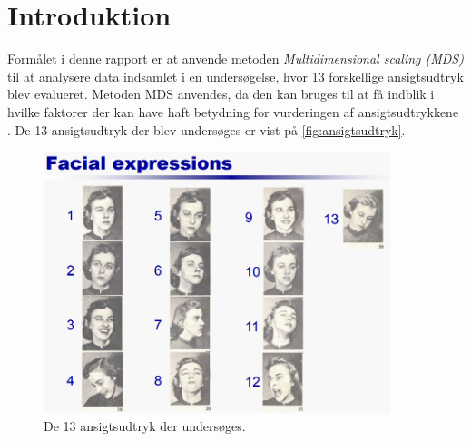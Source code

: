 \section*{Introduktion}
\label{Introduktion}
%
Formålet i denne rapport er at anvende metoden \textit{Multidimensional scaling (MDS)} til at analysere data indsamlet i en undersøgelse, hvor 13 forskellige ansigtsudtryk blev evalueret. Metoden MDS anvendes, da den kan bruges til at få indblik i hvilke faktorer der kan have haft betydning for vurderingen af ansigtsudtrykkene \parencite[p.2]{Wickelmaier2003}. De 13 ansigtsudtryk der blev undersøges er vist på \autoref{fig:ansigtsudtryk}. 

\begin{figure}[H]
\centering
\includegraphics[width = 0.9\textwidth]{Figure/FacialExpressions.PNG} 
\caption{De 13 ansigtsudtryk der undersøges.}
\label{fig:ansigtsudtryk}
\end{figure}

